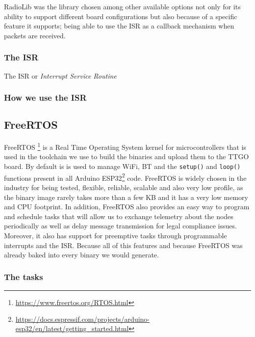 RadioLib was the library chosen among other available options not only for its ability to support different board configurations but also because of a specific feature it supports; being able to use the ISR as a callback mechanism when packets are received.
\subsubsection{The ISR}
The ISR or \textit{Interrupt Service Routine}
\subsubsection{How we use the ISR}
\subsection{FreeRTOS}
FreeRTOS \footnote{\url{https://www.freertos.org/RTOS.html}} is a Real Time Operating System kernel for microcontrollers that is used in the toolchain we use to build the binaries and upload them to the TTGO board. By default is is used to manage WiFi, BT and the \texttt{setup()} and \texttt{loop()} functions present in all Arduino ESP32\footnote{\url{https://docs.espressif.com/projects/arduino-esp32/en/latest/getting_started.html}} code. FreeRTOS is widely chosen in the industry for being tested, flexible, reliable, scalable and also very low profile, as the binary image rarely takes more than a few KB and it has a very low memory and CPU footprint\cite{FreeRTOSCharacteristics}. In addition, FreeRTOS also provides an easy way to program and schedule tasks that will allow us to exchange telemetry about the nodes periodically as well as delay message transmission for legal compliance issues. Moreover, it also has support for preemptive tasks through programmable interrupts and the ISR.
Because all of this features and because FreeRTOS was already baked into every binary we would generate.
\subsubsection{The tasks}
